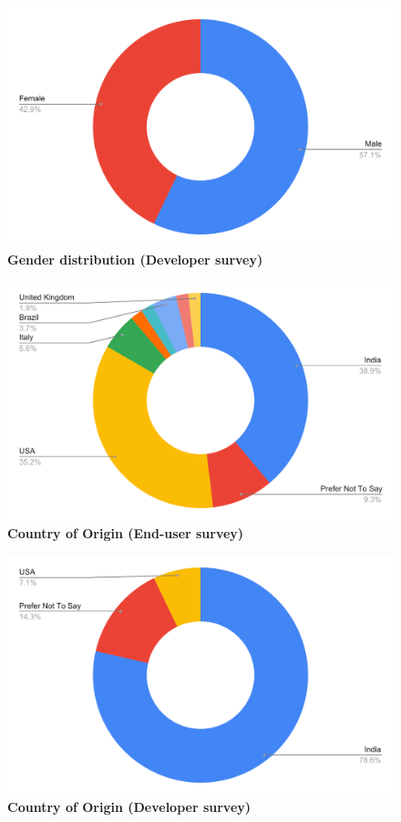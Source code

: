 \begin{figure}[H]
  \centering
  \includegraphics[width=13cm]{thesis/paper/images/p2d_gender.pdf}
  \textbf{Gender distribution (Developer survey)}
\end{figure}

\begin{figure}[H]
  \centering
  \includegraphics[width=13cm]{thesis/paper/images/p2u_country.pdf}
  \textbf{Country of Origin (End-user survey)}
\end{figure}

\begin{figure}[H]
  \centering
  \includegraphics[width=13cm]{thesis/paper/images/p2d_country.pdf}
  \textbf{Country of Origin (Developer survey)}
\end{figure}

